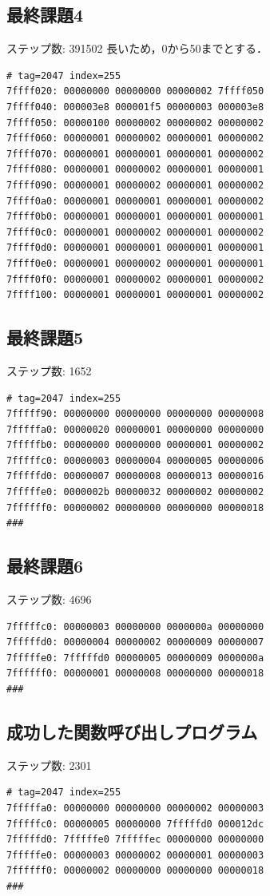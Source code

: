 \documentclass[a4paper,11pt]{jarticle}
\begin{document}
{\begin{verbatim}
\end{verbatim}
\subsection{最終課題4}
ステップ数: 391502
長いため，0から50までとする．
\begin{verbatim}
# tag=2047 index=255
7ffff020: 00000000 00000000 00000002 7ffff050
7ffff040: 000003e8 000001f5 00000003 000003e8
7ffff050: 00000100 00000002 00000002 00000002
7ffff060: 00000001 00000002 00000001 00000002
7ffff070: 00000001 00000001 00000001 00000002
7ffff080: 00000001 00000002 00000001 00000001
7ffff090: 00000001 00000002 00000001 00000002
7ffff0a0: 00000001 00000001 00000001 00000002
7ffff0b0: 00000001 00000001 00000001 00000001
7ffff0c0: 00000001 00000002 00000001 00000002
7ffff0d0: 00000001 00000001 00000001 00000001
7ffff0e0: 00000001 00000002 00000001 00000001
7ffff0f0: 00000001 00000002 00000001 00000002
7ffff100: 00000001 00000001 00000001 00000002

\end{verbatim}
\subsection{最終課題5}
ステップ数: 1652 
\begin{verbatim}
# tag=2047 index=255
7fffff90: 00000000 00000000 00000000 00000008
7fffffa0: 00000020 00000001 00000000 00000000
7fffffb0: 00000000 00000000 00000001 00000002
7fffffc0: 00000003 00000004 00000005 00000006
7fffffd0: 00000007 00000008 00000013 00000016
7fffffe0: 0000002b 00000032 00000002 00000002
7ffffff0: 00000002 00000000 00000000 00000018
###

\end{verbatim}
\subsection{最終課題6}
ステップ数: 4696
\begin{verbatim}
7fffffc0: 00000003 00000000 0000000a 00000000
7fffffd0: 00000004 00000002 00000009 00000007
7fffffe0: 7fffffd0 00000005 00000009 0000000a
7ffffff0: 00000001 00000008 00000000 00000018
###
\end{verbatim}
\subsection{成功した関数呼び出しプログラム}
ステップ数: 2301
\begin{verbatim}
# tag=2047 index=255
7fffffa0: 00000000 00000000 00000002 00000003
7fffffc0: 00000005 00000000 7fffffd0 000012dc
7fffffd0: 7fffffe0 7fffffec 00000000 00000000
7fffffe0: 00000003 00000002 00000001 00000003
7ffffff0: 00000002 00000000 00000000 00000018
###


\end{verbatim}}
\end{document}
